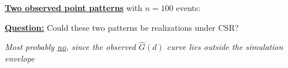 \documentclass[portrait]{seminar}
\begin{document}
%
%
\begin{slide*}
\begin{center}
 \vspace*{-0.5cm} 
\end{center}


\vspace{0.2cm} \underline{\textbf{Two observed point patterns}} with
$n=100$ events:

\vspace{0.0cm}
\begin{center}
\begin{figure}
\hspace{0.5cm} 
\end{figure}
\end{center}

\vspace{0.2cm}\underline{\textbf{Question:}} Could these two
patterns be realizations under CSR?

\begin{center}
\begin{figure}
\hspace{-0.3cm}
\hspace{0.5cm}
\end{figure}
\end{center}

\vspace{0.0cm}
\begin{center}
\emph{Most probably \underline{no}, since the observed $\hat{G}(d)$
curve lies outside the simulation envelope}
\end{center}

\end{slide*}
\end{document}
